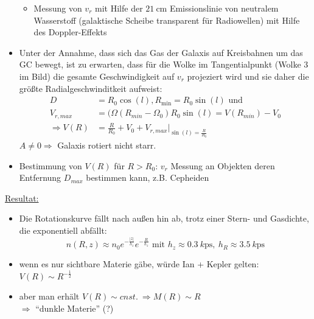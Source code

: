 \begin{itemize}
\begin{figure}[H]
\begin{multicols}{2}
\begin{figure}[H]
				\end{figure}
			\end{multicols}
		\end{figure}
		\begin{itemize}
			\item Messung von $v_r$ mit Hilfe der $\SI{21}{\cm}$ Emissionslinie von neutralem Wasserstoff (galaktische Scheibe transparent für Radiowellen) mit  Hilfe des Doppler-Effekts
		\end{itemize}
	\item Unter der Annahme, dass sich das Gas der Galaxis auf Kreisbahnen um das GC bewegt, ist zu erwarten, dass für die Wolke im Tangentialpunkt (Wolke 3 im Bild) die gesamte Geschwindigkeit auf $v_r$ projeziert wird und sie daher die größte Radialgeschwinditkeit aufweist:
		\begin{align*}
			D&=R_0\cos(l), R_\text{min}=R_0\sin(l) \text{ und } \\
			V_{r,max}&=(\Omega(R_{min}-\Omega_0)R_0\sin(l)=V(R_{min})-V_0\\
			\Rightarrow V(R)&=\frac{R}{R_0}+V_0+V_{r,max}|_{\sin(l)=\frac{R}{R_0}}
		\end{align*}
		$A\neq 0\Rightarrow$ Galaxis rotiert nicht starr.
	\item Bestimmung von $V(R)$ für $R>R_0$: $v_r$ Messung an Objekten deren Entfernung $D_{max}$ bestimmen kann, z.B. Cepheiden
\end{itemize}
\underline{Resultat:}\\
\begin{figure}[H]
\end{figure}
\begin{itemize}
	\item Die Rotationskurve fällt nach außen hin ab, trotz einer Stern- und Gasdichte, die exponentiell abfällt:
		\begin{equation*}
			n(R,z)\approx n_0e^{-\frac{|z|}{h_z}}e^{-\frac{R}{h_z}} \text{ mit } h_z\approx\SI{0.3}{k\ps},\ h_R\approx\SI{3.5}{k\ps}
		\end{equation*}
	\item wenn es nur sichtbare Materie gäbe, würde Ian + Kepler gelten: $V(R)\sim R^{-\frac{1}{2}}$
	\item aber man erhält $V(R)\sim cnst.\ \Rightarrow M(R)\sim R$\\
		$\Rightarrow$ "`dunkle Materie"' (?)
\end{itemize}
